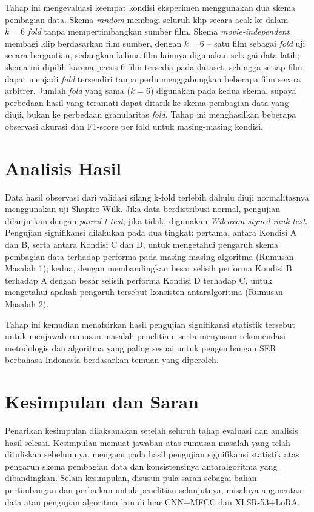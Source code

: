 Tahap ini mengevaluasi keempat kondisi eksperimen menggunakan dua skema
pembagian data. Skema \emph{random} membagi seluruh klip secara acak ke
dalam $k=6$ \emph{fold} tanpa mempertimbangkan sumber film. Skema
\emph{movie-independent} membagi klip berdasarkan film sumber, dengan
$k=6$ -- satu film sebagai \emph{fold} uji secara bergantian, sedangkan
kelima film lainnya digunakan sebagai data latih; skema ini dipilih
karena persis 6 film tersedia pada dataset, sehingga setiap film dapat
menjadi \emph{fold} tersendiri tanpa perlu menggabungkan beberapa film
secara arbitrer. Jumlah \emph{fold} yang sama ($k=6$) digunakan pada
kedua skema, supaya perbedaan hasil yang teramati dapat ditarik ke
skema pembagian data yang diuji, bukan ke perbedaan granularitas
\emph{fold}. Tahap ini menghasilkan beberapa observasi akurasi dan
F1-score per fold untuk masing-masing kondisi.

\section{Analisis Hasil}
\label{sec:3.6}

Data hasil observasi dari validasi silang k-fold terlebih dahulu diuji
normalitasnya menggunakan uji Shapiro-Wilk. Jika data berdistribusi
normal, pengujian dilanjutkan dengan \emph{paired t-test}; jika tidak,
digunakan \emph{Wilcoxon signed-rank test}. Pengujian signifikansi
dilakukan pada dua tingkat: pertama, antara Kondisi A dan B, serta
antara Kondisi C dan D, untuk mengetahui pengaruh skema pembagian data
terhadap performa pada masing-masing algoritma (Rumusan Masalah 1);
kedua, dengan membandingkan besar selisih performa Kondisi B terhadap A
dengan besar selisih performa Kondisi D terhadap C, untuk mengetahui
apakah pengaruh tersebut konsisten antaralgoritma (Rumusan Masalah 2).

Tahap ini kemudian menafsirkan hasil pengujian signifikansi statistik
tersebut untuk menjawab rumusan masalah penelitian, serta menyusun
rekomendasi metodologis dan algoritma yang paling sesuai untuk
pengembangan SER berbahasa Indonesia berdasarkan temuan yang diperoleh.

\section{Kesimpulan dan Saran}
\label{sec:3.7}

Penarikan kesimpulan dilaksanakan setelah seluruh tahap evaluasi dan
analisis hasil selesai. Kesimpulan memuat jawaban atas rumusan masalah
yang telah dituliskan sebelumnya, mengacu pada hasil pengujian
signifikansi statistik atas pengaruh skema pembagian data dan
konsistensinya antaralgoritma yang dibandingkan. Selain kesimpulan,
disusun pula saran sebagai bahan pertimbangan dan perbaikan untuk
penelitian selanjutnya, misalnya augmentasi data atau pengujian
algoritma lain di luar CNN+MFCC dan XLSR-53+LoRA.
